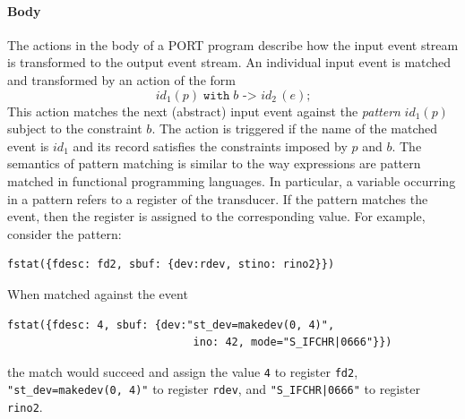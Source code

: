 \paragraph*{Body}
The actions in the body of a PORT program describe how the input event stream is transformed to the output event stream. An individual input event is matched and transformed by an action of the form
\[\mathit{id}_1(p) \;\mathtt{with}\; b \texttt{ -> } \mathit{id}_2\,(e)\texttt{;}\]
This action matches the next (abstract) input event against the \emph{pattern} $\mathit{id}_1(p)$ subject to the constraint $b$. The action is triggered if the name of the matched event is $\mathit{id}_1$ and its record satisfies the constraints imposed by $p$ and $b$. The semantics of pattern matching is similar to the way  expressions are pattern matched in functional programming languages. In particular, a variable occurring in a pattern refers to a register of the transducer. If the pattern matches the event, then the register is assigned to the corresponding value. For example, consider the pattern:
\begin{lstlisting}[numbers=none,xleftmargin=0em,gobble=2]
  fstat({fdesc: fd2, sbuf: {dev:rdev, stino: rino2}})
\end{lstlisting}
When matched against the event
\begin{lstlisting}[numbers=none,xleftmargin=0em,gobble=2]
  fstat({fdesc: 4, sbuf: {dev:"st_dev=makedev(0, 4)",
                             ino: 42, mode="S_IFCHR|0666"}})
\end{lstlisting}
the match would succeed and assign the value \lstinline+4+ to register \lstinline+fd2+, \lstinline+"st_dev=makedev(0, 4)"+ to register \lstinline+rdev+, and \lstinline+"S_IFCHR|0666"+ to register \lstinline+rino2+.

